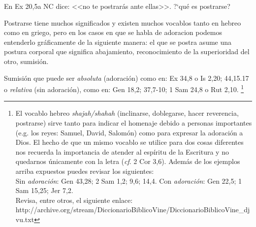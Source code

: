 \documentclass{article}
\begin{document}
En Ex 20,5a NC dice: <<no te postrar\'as ante ellas>>. ?`qu\'e es postrarse?

Postrarse tiene muchos significados y existen muchos vocablos tanto en hebreo como en griego, pero en los casos en que se habla de adoracion podemos entenderlo gr\'aficamente de la siguiente manera: el que se postra asume una postura corporal que significa abajamiento, reconocimiento de la superioridad del otro, sumisi\'on.

Sumisi\'on que puede ser \emph{absoluta} (adoraci\'on) como en: Ex 34,8 o Is 2,20; 44,15.17 o \emph{relativa} (sin adoraci\'on), como en: Gen 18,2; 37,7-10; 1 Sam 24,8 o Rut 2,10.%
    \footnote{El vocablo hebreo \emph{shajah/shahah} (inclinarse, doblegarse, hacer reverencia, postrarse) sirve tanto para indicar el homenaje debido a personas importantes (e.g. los reyes: Samuel, David, Salom\'on) como para expresar la adoraci\'on a Dios. El hecho de que un mismo vocablo se utilice para dos cosas diferentes nos recuerda la importancia de atender al esp\'{i}ritu de la Escritura y no quedarnos \'unicamente con la letra (\emph{cf}. 2 Cor 3,6). Adem\'as de los ejemplos arriba expuestos puedes revisar los siguientes:\\ Sin \emph{adoraci\'on}: Gen 43,28; 2 Sam 1,2; 9,6; 14,4. Con \emph{adoraci\'on}: Gen 22,5; 1 Sam 15,25; Jer 7,2.\\ Revisa, entre otros, el siguiente enlace: http://archive.org/stream/DiccionarioBiblicoVine/DiccionarioBiblicoVine\_djvu.txt}
\end{document}
